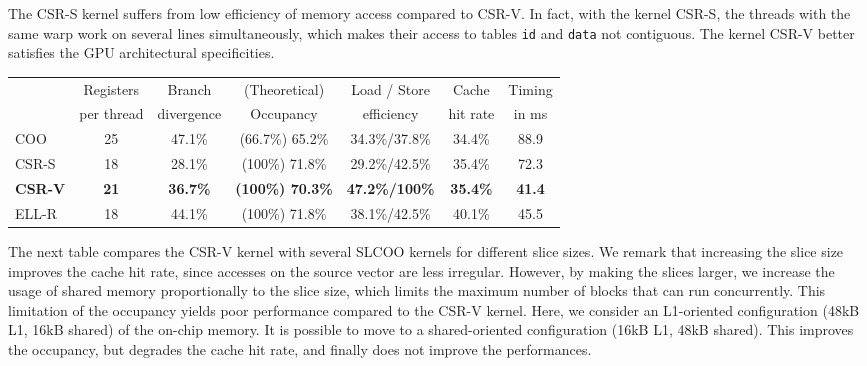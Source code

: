 \documentclass[runningheads,orivec]{llncs}
\begin{document}
The CSR-S kernel suffers from low efficiency of memory access compared to CSR-V. In fact, with the kernel CSR-S, the threads with the same warp work on several lines simultaneously, which makes their access to tables \texttt{id} and \texttt{data} not contiguous. The kernel CSR-V better satisfies the GPU architectural specificities.

\vspace*{-0.25cm}



  \begin{center}
    \begin{tabular}{|l||c|c|c|c|c||c|}
      \hline
        & \footnotesize Registers & \footnotesize Branch & \footnotesize (Theoretical) & \footnotesize Load / Store & \footnotesize Cache & \footnotesize Timing\\
        & \footnotesize per thread & \footnotesize divergence & \footnotesize Occupancy & \footnotesize efficiency & \footnotesize hit rate & \footnotesize in ms\\  
      \hline
      \hline
	  \footnotesize COO & \footnotesize 25 & \footnotesize 47.1\% & \footnotesize (66.7\%) 65.2\% & \footnotesize 34.3\%/37.8\% & \footnotesize 34.4\% & \footnotesize 88.9 \\
	  \hline
      \small CSR-S & \footnotesize 18 &  \footnotesize 28.1\% & \footnotesize (100\%) 71.8\% & \footnotesize 29.2\%/42.5\% & \footnotesize 35.4\% & \footnotesize 72.3 \\
	  \hline
      \bf \small CSR-V & \bf \footnotesize 21 & \bf \footnotesize 36.7\% & \bf \footnotesize (100\%) 70.3\% & \bf \footnotesize 47.2\%/100\% & \bf \footnotesize 35.4\% & \bf \footnotesize 41.4 \\
	  \hline
	  \footnotesize ELL-R & \footnotesize 18 & \footnotesize 44.1\% & \footnotesize (100\%) 71.8\%& \footnotesize 38.1\%/42.5\% & \footnotesize 40.1\% & \footnotesize 45.5 \\
	  \hline
    \end{tabular}
  \end{center}


\vspace*{-0.25cm}

The next table compares the CSR-V kernel with several SLCOO kernels for different slice sizes. We remark that increasing the slice size improves the cache hit rate, since accesses on the source vector are less irregular. However, by making the slices larger, we increase the usage of shared memory proportionally to the slice size, which limits the maximum number of blocks that can run concurrently. This limitation of the occupancy yields poor performance compared to the CSR-V kernel. Here, we consider an L1-oriented configuration (48kB L1, 16kB shared) of the on-chip memory. It is possible to move to a shared-oriented configuration (16kB L1, 48kB shared). This improves the occupancy, but degrades the cache hit rate, and finally does not improve the performances.
\end{document}
